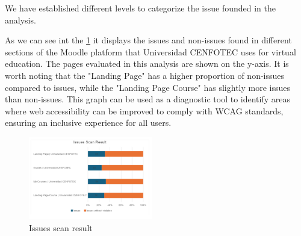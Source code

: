 \documentclass{IEEEtran}
\begin{document}
We have established different levels to categorize the issue founded in the analysis.

As we can see int the \ref{fig:figure3} it displays the issues and non-issues found in different sections of the Moodle platform that Universidad CENFOTEC uses for virtual education. The pages evaluated in this analysis are shown on the y-axis. It is worth noting that the "Landing Page" has a higher proportion of non-issues compared to issues, while the "Landing Page Course" has slightly more issues than non-issues. This graph can be used as a diagnostic tool to identify areas where web accessibility can be improved to comply with WCAG standards, ensuring an inclusive experience for all users.

\begin{figure}[H]
    \includegraphics[width=0.48\textwidth]{images/scanResult.png}
    \caption{Issues scan result}
    \label{fig:figure3}
\end{figure}
\end{document}
